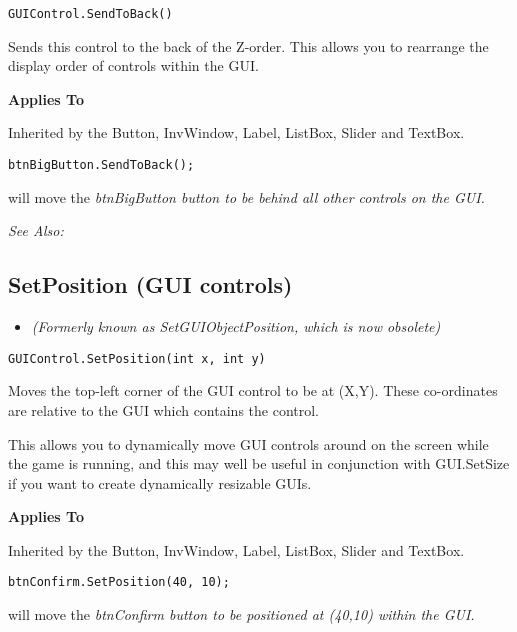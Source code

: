 \begin{verbatim}
GUIControl.SendToBack()
\end{verbatim}
Sends this control to the back of the Z-order. This allows you to rearrange the display order
of controls within the GUI.

\bf{Applies To}

Inherited by the Button, InvWindow, Label, ListBox, Slider and TextBox.

\begin{verbatim}
btnBigButton.SendToBack();
\end{verbatim}
will move the \it{btnBigButton} button to be behind all other controls on the GUI.

\it{See Also:} 


\subsection{SetPosition (GUI controls)}\label{GUIControl.SetPosition}%

\begin{itemize}
\item \it{(Formerly known as SetGUIObjectPosition, which is now obsolete)}
\end{itemize}

\begin{verbatim}
GUIControl.SetPosition(int x, int y)
\end{verbatim}
Moves the top-left corner of the GUI control to be at (X,Y). These co-ordinates
are relative to the GUI which contains the control.

This allows you to dynamically move GUI controls around on the screen while the
game is running, and this may well be useful in conjunction with GUI.SetSize if you
want to create dynamically resizable GUIs.

\bf{Applies To}

Inherited by the Button, InvWindow, Label, ListBox, Slider and TextBox.

\begin{verbatim}
btnConfirm.SetPosition(40, 10);
\end{verbatim}
will move the \it{btnConfirm} button to be positioned at (40,10) within the GUI.

